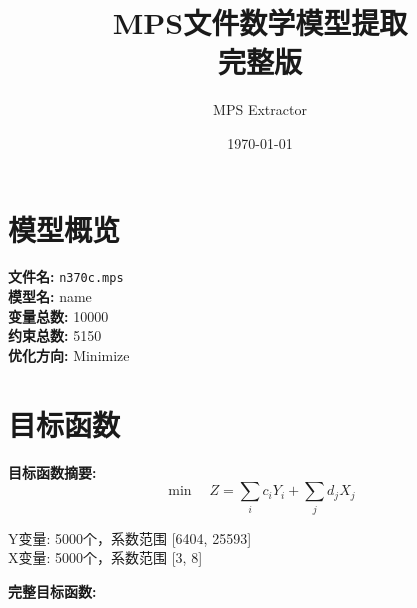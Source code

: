 \documentclass[a4paper,10pt]{article}
\title{MPS文件数学模型提取\\{\large 完整版}}
\author{MPS Extractor}
\date{\today}
\begin{document}
\maketitle
\tableofcontents
\newpage

\section{模型概览}

\textbf{文件名:} \texttt{n370c.mps} \\
\textbf{模型名:} name \\
\textbf{变量总数:} 10000 \\
\textbf{约束总数:} 5150 \\
\textbf{优化方向:} Minimize \\

\section{目标函数}

\textbf{目标函数摘要:}
\begin{equation}
\min \quad Z = \sum_{i} c_i Y_i + \sum_{j} d_j X_j
\end{equation}

Y变量: 5000个，系数范围 [6404, 25593] \\
X变量: 5000个，系数范围 [3, 8]

\textbf{完整目标函数:}
\end{document}
